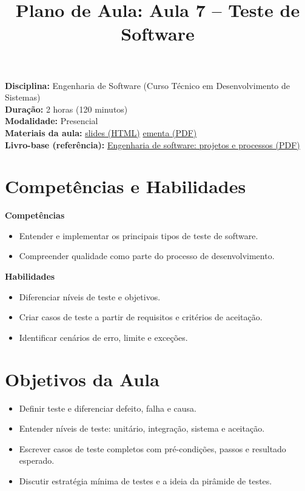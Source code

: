\documentclass[12pt,a4paper]{article}
\title{Plano de Aula: Aula 7 -- Teste de Software}
\date{}
\begin{document}
\maketitle

\noindent
\textbf{Disciplina:} Engenharia de Software (Curso Técnico em Desenvolvimento de Sistemas)\\
\textbf{Duração:} 2 horas (120 minutos)\\
\textbf{Modalidade:} Presencial\\
\textbf{Materiais da aula:} \href{aula-07.html}{slides (HTML)} \quad \href{aula-07.pdf}{ementa (PDF)}\\
\textbf{Livro-base (referência):} \href{../99-Materiais/Engenharia%20de%20software%20projetos%20e%20processos%20by%20Wilson%20de%20P%C3%A1dua%20Paula%20Filho%20.epub.pdf}{Engenharia de software: projetos e processos (PDF)}

\section{Competências e Habilidades}
\textbf{Competências}
\begin{itemize}[leftmargin=*,itemsep=0.25em]
  \item Entender e implementar os principais tipos de teste de software.
  \item Compreender qualidade como parte do processo de desenvolvimento.
\end{itemize}

\textbf{Habilidades}
\begin{itemize}[leftmargin=*,itemsep=0.25em]
  \item Diferenciar níveis de teste e objetivos.
  \item Criar casos de teste a partir de requisitos e critérios de aceitação.
  \item Identificar cenários de erro, limite e exceções.
\end{itemize}

\section{Objetivos da Aula}
\begin{itemize}[leftmargin=*,itemsep=0.25em]
  \item Definir teste e diferenciar defeito, falha e causa.
  \item Entender níveis de teste: unitário, integração, sistema e aceitação.
  \item Escrever casos de teste completos com pré-condições, passos e resultado esperado.
  \item Discutir estratégia mínima de testes e a ideia da pirâmide de testes.
\end{itemize}
\end{document}
